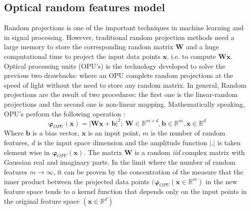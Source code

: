 \subsection{Optical random features model}
Random projections is one of the important techniques in machine learning and in signal processing. However, traditional random projection methods need a large memory to store the corresponding random matrix $\mathbf{W}$ and a huge computational time to project the input data points $\mathbf{x}$, i.e. to compute $\mathbf{Wx}$. Optical processing units (OPU's) is the technology developed to solve the previous two drawbacks: where an OPU complete random projections at the speed of light without the need to store any random matrix. In general, Random projections are the result of two procedures: the first one is the linear-random projections and the second one is non-linear mapping.
Mathematically speaking, OPU's perform the following operation \citep{saade_opu}:
\begin{equation}
\label{OPU_equation}
\mathbf{\varphi}_{OPU}(\mathbf{x})=|\mathbf{Wx+b}|^2 ;~\mathbf{W}\in \mathbb{R}^{m\times d},\mathbf{b}\in \mathbb{R}^m, \mathbf{x}\in \mathbb{R}^d
\end{equation}
Where $\mathbf{b}$ is a bias vector, $\mathbf{x}$ is an input point, $m$ is the number of random features, $d$ is the input space dimension and the amplitude function $|.|$ is taken element wise in $\mathbf{\varphi}_{OPU}(\mathbf{x})$. The matrix $\mathbf{W}$ is a random \emph{iid} complex matrix with Gaussian real and imaginary parts.\newline
In the limit where the number of random features $m\xrightarrow{}\infty$, it can be proven by the concentration of the measure that the inner product between the projected data points $(\mathbf{\varphi}_{OPU}(\mathbf{x}\in \mathbb{R}^m)$ in the new feature space tends to a kernel function that depends only on the input points in the original feature space $(\mathbf{x}\in \mathbb{R}^d)$

